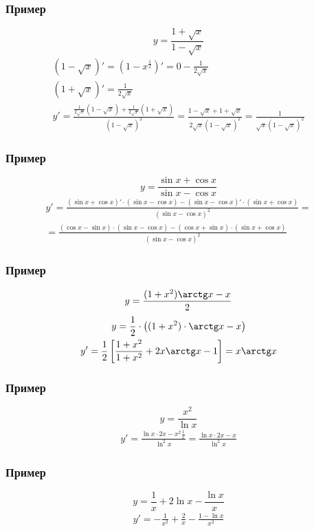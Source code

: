 \documentclass{article}
\begin{document}
\subsubsection{Пример}
\[
    y = \frac{1 + \sqrt{x}}{1 - \sqrt{x}}
\]
\begin{gather*}
    (1 - \sqrt{x})' = (1 - x^{\frac{1}{2}})' = 0 - \frac{1}{2 \sqrt{x}} \\
    (1 + \sqrt{x})' = \frac{1}{2 \sqrt{x}} \\
    y' = \frac{\frac{1}{2 \sqrt{x}} (1 - \sqrt{x}) + \frac{1}{2 \sqrt{x}} (1 + \sqrt{x})}{(1 - \sqrt{x})^2} =
    \frac{1 - \sqrt{x} + 1 + \sqrt{x}}{2 \sqrt{x} (1 - \sqrt{x})^2} =
    \frac{1}{\sqrt{x} (1 - \sqrt{x})^2}
\end{gather*}

\subsubsection{Пример}
\[
    y = \frac{\sin x + \cos x}{\sin x - \cos x}
\]
\begin{gather*}
    y' = \frac{(\sin x + \cos x)' \cdot (\sin x - \cos x) - (\sin x - \cos x)' \cdot (\sin x + \cos x)}{(\sin x - \cos x)^2} = \\
    = \frac{(\cos x - \sin x) \cdot (\sin x - \cos x) - (\cos x + \sin x) \cdot (\sin x + \cos x)}{(\sin x - \cos x)^2}
\end{gather*}

\subsubsection{Пример}
\[
    y = \frac{(1 + x^2) \arctg x - x}{2}
\]
\begin{gather*}
    y = \frac{1}{2} \cdot \left( (1 + x^2) \cdot \arctg x - x \right) \\
    y' = \frac{1}{2} \left[ \frac{1 + x^2}{1 + x^2} + 2x \arctg x - 1 \right] =
    x \arctg x
\end{gather*}

\subsubsection{Пример}
\[
    y = \frac{x^2}{\ln x}
\]
\begin{gather*}
    y' = \frac{\ln x \cdot 2x - x^2 \frac{1}{x}}{\ln^2 x} =
    \frac{\ln x \cdot 2x - x}{\ln^2 x}
\end{gather*}

\subsubsection{Пример}
\[
    y = \frac{1}{x} + 2 \ln x - \frac{\ln x}{x}
\]
\begin{gather*}
    y' = -\frac{1}{x^2} + \frac{2}{x} - \frac{1 - \ln x}{x^2}
\end{gather*}
\end{document}
